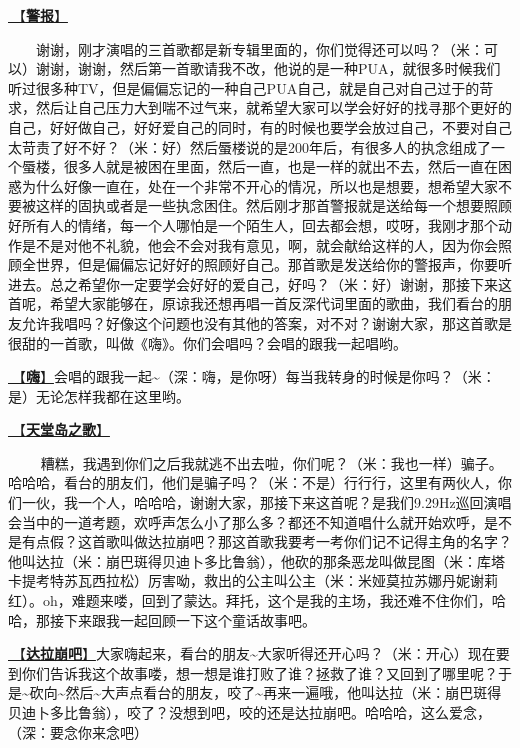 \documentclass[]{ctexbook}
\begin{document}
\hyperref[the-giver]{🎵【\textbf{警报}】}

  谢谢，刚才演唱的三首歌都是新专辑里面的，你们觉得还可以吗？（米：可以）谢谢，谢谢，然后第一首歌请我不改，他说的是一种PUA，就很多时候我们听过很多种TV，但是偏偏忘记的一种自己PUA自己，就是自己对自己过于的苛求，然后让自己压力大到喘不过气来，就希望大家可以学会好好的找寻那个更好的自己，好好做自己，好好爱自己的同时，有的时候也要学会放过自己，不要对自己太苛责了好不好？（米：好）然后蜃楼说的是200年后，有很多人的执念组成了一个蜃楼，很多人就是被困在里面，然后一直，也是一样的就出不去，然后一直在困惑为什么好像一直在，处在一个非常不开心的情况，所以也是想要，想希望大家不要被这样的固执或者是一些执念困住。然后刚才那首警报就是送给每一个想要照顾好所有人的情绪，每一个人哪怕是一个陌生人，回去都会想，哎呀，我刚才那个动作是不是对他不礼貌，他会不会对我有意见，啊，就会献给这样的人，因为你会照顾全世界，但是偏偏忘记好好的照顾好自己。那首歌是发送给你的警报声，你要听进去。总之希望你一定要学会好好的爱自己，好吗？（米：好）谢谢，那接下来这首呢，希望大家能够在，原谅我还想再唱一首反深代词里面的歌曲，我们看台的朋友允许我唱吗？好像这个问题也没有其他的答案，对不对？谢谢大家，那这首歌是很甜的一首歌，叫做《嗨》。你们会唱吗？会唱的跟我一起唱哟。

\hyperref[say-hi]{🎵【\textbf{嗨}】}会唱的跟我一起\textasciitilde（深：嗨，是你呀）每当我转身的时候是你吗？（米：是）无论怎样我都在这里哟。

\hyperref[haven-song]{🎵【\textbf{天堂岛之歌}】}

   糟糕，我遇到你们之后我就逃不出去啦，你们呢？（米：我也一样）骗子。哈哈哈，看台的朋友们，他们是骗子吗？（米：不是）行行行，这里有两伙人，你们一伙，我一个人，哈哈哈，谢谢大家，那接下来这首呢？是我们9.29Hz巡回演唱会当中的一道考题，欢呼声怎么小了那么多？都还不知道唱什么就开始欢呼，是不是有点假？这首歌叫做达拉崩吧？那这首歌我要考一考你们记不记得主角的名字？他叫达拉（米：崩巴斑得贝迪卜多比鲁翁），他砍的那条恶龙叫做昆图（米：库塔卡提考特苏瓦西拉松）厉害呦，救出的公主叫公主（米：米娅莫拉苏娜丹妮谢莉红）。oh，难题来喽，回到了蒙达。拜托，这个是我的主场，我还难不住你们，哈哈，那接下来跟我一起回顾一下这个童话故事吧。

\hyperref[dalabengba]{🎵【\textbf{达拉崩吧}】}大家嗨起来，看台的朋友\textasciitilde 大家听得还开心吗？（米：开心）现在要到你们告诉我这个故事喽，想一想是谁打败了谁？拯救了谁？又回到了哪里呢？于是\textasciitilde 砍向\textasciitilde 然后\textasciitilde 大声点看台的朋友，咬了\textasciitilde 再来一遍哦，他叫达拉（米：崩巴斑得贝迪卜多比鲁翁），咬了？没想到吧，咬的还是达拉崩吧。哈哈哈，这么爱念，（深：要念你来念吧）
\end{document}
